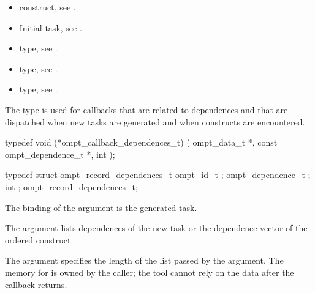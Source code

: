 \crossreferences
\begin{itemize}
\item {} construct, see .

\item Initial task, see .

\item {} type, see
.

\item {} type, see
.

\item {} type, see
.
\end{itemize}



\label{sec:ompt_callback_dependences_t}

\summary
The  type is used for callbacks that are 
related to dependences and that are dispatched when new tasks are generated 
and when  constructs are encountered.

\format
\begin{ccppspecific}
\begin{omptCallback}
typedef void (*ompt_callback_dependences_t) (
  ompt_data_t *,
  const ompt_dependence_t *,
  int 
);
\end{omptCallback}
\end{ccppspecific}

\record
\begin{ccppspecific}
\begin{omptRecord}
typedef struct ompt_record_dependences_t {
  ompt_id_t ;
  ompt_dependence_t ;
  int ;
} ompt_record_dependences_t;
\end{omptRecord}
\end{ccppspecific}

\argdesc
The binding of the  argument is the generated task.

The  argument lists dependences of the new task or the 
dependence vector of the ordered construct.

The  argument specifies the length of the list passed
by the  argument. The memory for  is owned by 
the caller; the tool cannot rely on the data after the callback returns.

